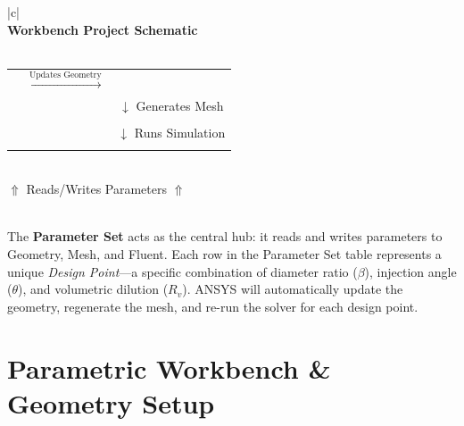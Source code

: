 \documentclass[12pt,a4paper]{report}
\begin{document}
\begin{center}
\small
\setlength{\tabcolsep}{6pt}
\begin{tabular}{|c|}
\hline
\\[-4pt]
\textbf{Workbench Project Schematic} \\[6pt]
\hline
\\[-2pt]
\begin{tabular}{ccc}
\fbox{\parbox{3.4cm}{\centering\textbf{Geometry}\\[2pt]\footnotesize Parameters: $\beta$, $\theta$}}
& $\xrightarrow{\text{Updates Geometry}}$
& \fbox{\parbox{3.4cm}{\centering\textbf{Mesh}\\[2pt]\footnotesize Parameters: SOI\_Radius}} \\[14pt]
& & $\downarrow$ {\footnotesize Generates Mesh} \\[6pt]
& & \fbox{\parbox{3.4cm}{\centering\textbf{Fluent}\\[2pt]\footnotesize Parameters: $R_v$}} \\[14pt]
& & $\downarrow$ {\footnotesize Runs Simulation} \\[6pt]
& & \fbox{\parbox{3.4cm}{\centering\textbf{Results}\\[2pt]\footnotesize for Each Design Point}}
\end{tabular} \\[10pt]
$\Uparrow$ \quad Reads/Writes Parameters \quad $\Uparrow$ \\[4pt]
 \\[6pt]
\hline
\end{tabular}
\end{center}

\medskip
The \textbf{Parameter Set} acts as the central hub: it reads and writes parameters to Geometry, Mesh, and Fluent. Each row in the Parameter Set table represents a unique \textit{Design Point}---a specific combination of diameter ratio ($\beta$), injection angle ($\theta$), and volumetric dilution ($R_v$). ANSYS will automatically update the geometry, regenerate the mesh, and re-run the solver for each design point.


\section{Parametric Workbench \& Geometry Setup}
\end{document}
